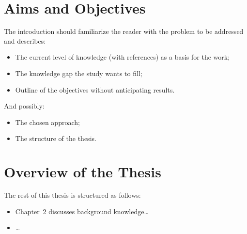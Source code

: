 \section{Aims and Objectives}

The introduction should familiarize the reader with the problem to be addressed and describes:
\begin{itemize}
    \item The current level of knowledge (with references) as a basis for the work;
    \item The knowledge gap the study wants to fill;
    \item Outline of the objectives without anticipating results.
\end{itemize}
And possibly:
\begin{itemize}
	\item The chosen approach;
	\item The structure of the thesis.
\end{itemize}

\section{Overview of the Thesis}

The rest of this thesis is structured as follows: 
\begin{itemize}
    \item Chapter~2 discusses background knowledge\ldots
    \item \ldots
\end{itemize}
